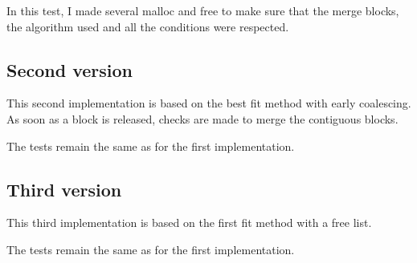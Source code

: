 In this test, I made several malloc and free to make sure that the merge blocks, the algorithm used and all the conditions were respected.



\subsection{Second version}
This second implementation is based on the best fit method with early coalescing. As soon as a block is released, checks are made to merge the contiguous blocks.


The tests remain the same as for the first implementation.


\subsection{Third version}
This third implementation is based on the first fit method with a free list. 


The tests remain the same as for the first implementation.




